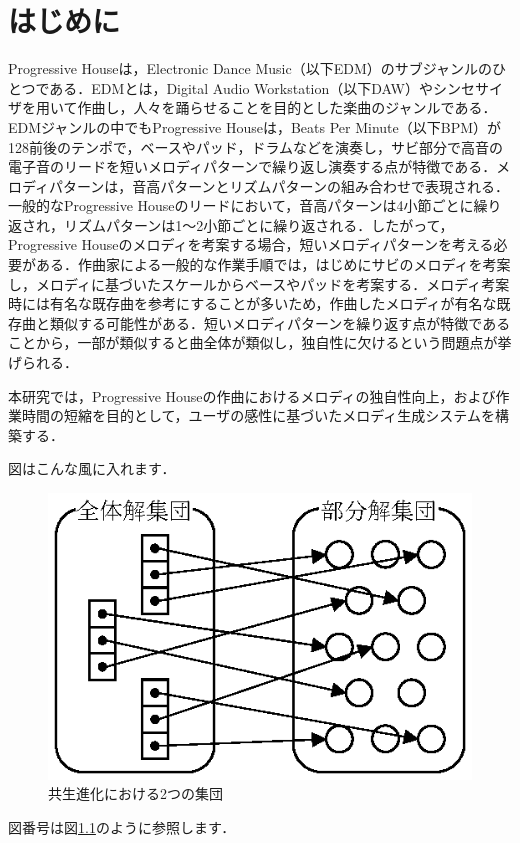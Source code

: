 \chapter{はじめに}
Progressive Houseは，Electronic Dance Music（以下EDM）のサブジャンルのひとつである\cite{Sonja18}．EDMとは，Digital Audio Workstation（以下DAW）やシンセサイザを用いて作曲し，人々を踊らせることを目的とした楽曲のジャンルである．EDMジャンルの中でもProgressive Houseは，Beats Per Minute（以下BPM）が128前後のテンポで，ベースやパッド，ドラムなどを演奏し，サビ部分で高音の電子音のリードを短いメロディパターンで繰り返し演奏する点が特徴である．メロディパターンは，音高パターンとリズムパターンの組み合わせで表現される．一般的なProgressive Houseのリードにおいて，音高パターンは4小節ごとに繰り返され，リズムパターンは1〜2小節ごとに繰り返される．したがって，Progressive Houseのメロディを考案する場合，短いメロディパターンを考える必要がある．作曲家による一般的な作業手順では，はじめにサビのメロディを考案し，メロディに基づいたスケールからベースやパッドを考案する．メロディ考案時には有名な既存曲を参考にすることが多いため，作曲したメロディが有名な既存曲と類似する可能性がある．短いメロディパターンを繰り返す点が特徴であることから，一部が類似すると曲全体が類似し，独自性に欠けるという問題点が挙げられる．

本研究では，Progressive Houseの作曲におけるメロディの独自性向上，および作業時間の短縮を目的として，ユーザの感性に基づいたメロディ生成システムを構築する．




図はこんな風に入れます．

\begin{figure}[tbhp]
\begin{center}
\includegraphics[scale=0.95]{image/se.eps}
\caption{共生進化における2つの集団}
\label{fig:02se}
\end{center}
\end{figure}

図番号は図\ref{fig:02se}のように参照します．
